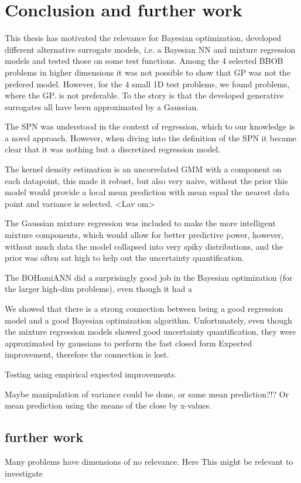 \chapter{Conclusion and further work}


This thesis has motivated the relevance for Bayesian optimization, developed different alternative
surrogate models, i.e. a Bayesian NN and mixture regression models and tested those on some 
test functions. Among the 4 selected BBOB problems in higher dimensions it was not possible to show that
GP was not the prefered model. However, for the 4 small 1D test problems, we found problems, where the GP. 
is not preferable. To the story is that the developed generative surrogates all have been approximated by
a Gaussian. 

The SPN was understood in the context of regression, which to our knowledge is a novel approach. However, 
when diving into the definition of the SPN it became clear that it was nothing but a discretized regression model. 

The kernel density estimation is an uncorrelated GMM with a component on each datapoint, this made
it robust, but also very naive, without the prior this model would provide a local mean prediction
with mean equal the nearest data point and variance is selected. <Lav om>

The Gaussian mixture regression was included to make the more intelligent mixture components, which
would allow for better predictive power, however, without much data the model collapsed into very
spiky distributions, and the prior was often sat high to help out the uncertainty quantification. 

The BOHamiANN did a surprisingly good job in the Bayesian optimization (for the larger high-dim problems),
even though it had a 

We showed that there is a strong connection between being a good regression model and a good Bayesian optimization
algorithm. Unfortunately, even though the mixture regression models showed good uncertainty quantification,
they were approximated by gaussians to perform the fast closed form Expected improvement, therefore the 
connection is lost. 

Testing using empirical expected improvements. 

Maybe manipulation of variance could be done, or same mean prediction?!? Or 
mean prediction using the means of the close by x-values. 

\section{further work}
Many problems have dimensions of no relevance. Here This might be relevant to investigate

